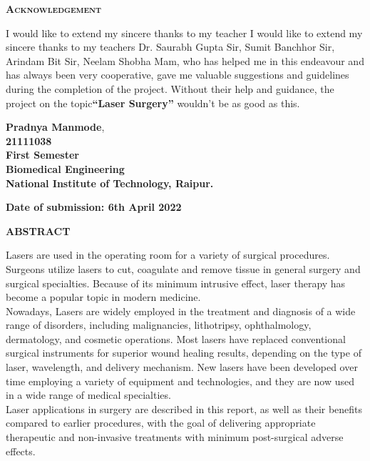 \documentclass[12pt]{article}
\begin{document}
\newpage
\pagestyle{fancy}
\begin{center}
\textsc{\huge\textbf{Acknowledgement}}   
\end{center}

\indent
\large

I would like to extend my sincere thanks to my teacher I would like to extend my sincere thanks to my teachers Dr. Saurabh Gupta Sir, Sumit Banchhor Sir, Arindam Bit Sir, Neelam Shobha Mam, who has helped me in this endeavour and has always been very cooperative, gave me valuable suggestions and guidelines during the completion of the project. Without their help and guidance, the project on the topic{\textbf{“Laser Surgery”}} wouldn’t be as good as this. 

\indent

\begin{flushright}
{\textbf{Pradnya Manmode}}, \\
\textbf{21111038} \\
\textbf{First Semester} \\
\textbf{Biomedical Engineering} \\
\textbf{National Institute of Technology, Raipur.} \\ 
\end{flushright}

\indent 

\textbf{Date of submission: 6th April 2022}

\newpage
\pagestyle{fancy}
\begin{center}
    \textsc{\huge\textbf{ABSTRACT}}
\end{center}
 
 \indent
 

\hspace{3cm}Lasers are used in the operating room for a variety of surgical procedures. Surgeons utilize lasers to cut, coagulate and remove tissue in general surgery and surgical specialties. Because of its minimum intrusive effect, laser therapy has become a popular topic in modern medicine. \\
Nowadays, Lasers are widely employed in the treatment and diagnosis of a wide range of disorders, including malignancies, lithotripsy, ophthalmology, dermatology, and cosmetic operations. Most lasers have replaced conventional surgical instruments for superior wound healing results, depending on the type of laser, wavelength, and delivery mechanism. 
New lasers have been developed over time employing a variety of equipment and technologies, and they are now used in a wide range of medical specialties.\\
Laser applications in surgery are described in this report, as well as their benefits compared to earlier procedures, with the goal of delivering appropriate therapeutic and non-invasive treatments with minimum post-surgical adverse effects.
 
\end{document}
